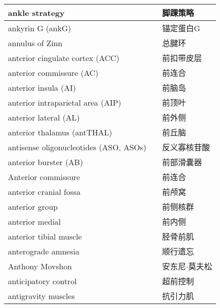 \begin{longtable}{lll}
	\midrule
	ankle strategy     && 脚踝策略   \\
	
	\midrule
	ankyrin G (ankG)    && 锚定蛋白G   \\
	
	\midrule
	annulus of Zinn     && 总腱环   \\
	
	\midrule
	anterior cingulate cortex (ACC)     && 前扣带皮层   \\
	
	\midrule
	anterior commissure (AC)     && 前连合   \\
	
	\midrule
	anterior insula (AI)     && 前脑岛   \\
	
	\midrule
	anterior intraparietal area (AIP)     && 前顶叶   \\
	
	\midrule
	anterior lateral (AL)     && 前外侧   \\
	
	\midrule
	anterior thalamus (antTHAL)     && 前丘脑   \\
	
	\midrule
	antisense oligonucleotides (ASO, ASOs)     && 反义寡核苷酸   \\
	
	\midrule
	anterior burster  (AB)   && 	前部滑囊器   \\
	
	\midrule
	Anterior commissure     && 	前连合   \\
	
	\midrule
	anterior cranial fossa     && 	前颅窝   \\
	
	\midrule
	anterior group    && 	前侧核群   \\
	
	\midrule
	anterior medial     && 	前内侧   \\
	
	\midrule
	anterior tibial muscle     && 	胫骨前肌   \\
	
	\midrule
	anterograde amnesia     && 	顺行遗忘   \\
	
	\midrule
	Anthony Movshon     && 	安东尼$\cdot$莫夫松   \\
	
	\midrule
	anticipatory control     && 	超前控制   \\
	
	\midrule
	antigravity muscles     && 	抗引力肌   \\
	

\end{longtable}
